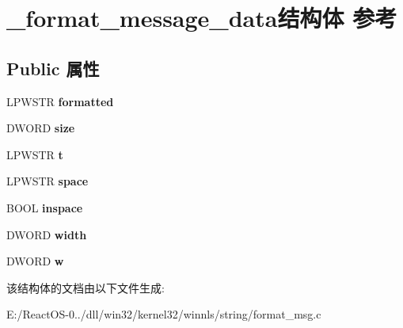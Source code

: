 \hypertarget{struct__format__message__data}{}\section{\+\_\+format\+\_\+message\+\_\+data结构体 参考}
\label{struct__format__message__data}
\subsection*{Public 属性}
\begin{DoxyCompactItemize}
\item 
\mbox{\label{struct__format__message__data_afd791b78e5b1600cd909c21a39208081}} 
L\+P\+W\+S\+TR {\bfseries formatted}
\item 
\mbox{\label{struct__format__message__data_a2d6834b53e542dabc6abe123cd04b7ab}} 
D\+W\+O\+RD {\bfseries size}
\item 
\mbox{\label{struct__format__message__data_a40b8c0dc4e21d19c1b63da124afd84cf}} 
L\+P\+W\+S\+TR {\bfseries t}
\item 
\mbox{\label{struct__format__message__data_ac714b4eabffbca6ef638ca488e57a2dc}} 
L\+P\+W\+S\+TR {\bfseries space}
\item 
\mbox{\label{struct__format__message__data_a23b88ca55fefab0b38bee26874676125}} 
B\+O\+OL {\bfseries inspace}
\item 
\mbox{\label{struct__format__message__data_a37f165b8083bcb77dc0d2a164540ba9b}} 
D\+W\+O\+RD {\bfseries width}
\item 
\mbox{\label{struct__format__message__data_af190ebc5f09628224f5deb6324eaadff}} 
D\+W\+O\+RD {\bfseries w}
\end{DoxyCompactItemize}


该结构体的文档由以下文件生成\+:\begin{DoxyCompactItemize}
\item 
E\+:/\+React\+O\+S-\/0../dll/win32/kernel32/winnls/string/format\+\_\+msg.\+c\end{DoxyCompactItemize}
